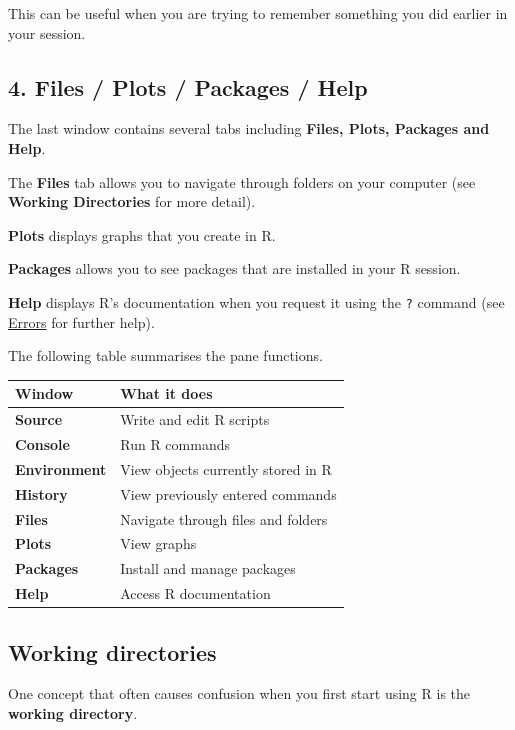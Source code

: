 \documentclass[
]{book}
\begin{document}
This can be useful when you are trying to remember something you did earlier in your session.

\subsection{4. Files / Plots / Packages / Help}\label{files-plots-packages-help}

The last window contains several tabs including \textbf{Files, Plots, Packages and Help}.

The \textbf{Files} tab allows you to navigate through folders on your computer (see \textbf{Working Directories} for more detail).

\textbf{Plots} displays graphs that you create in R.

\textbf{Packages} allows you to see packages that are installed in your R session.

\textbf{Help} displays R's documentation when you request it using the \texttt{?} command (see \hyperref[Errors]{Errors} for further help).

The following table summarises the pane functions.

\begin{longtable}[]{@{}ll@{}}
\toprule\noalign{}
Window & What it does \\
\midrule\noalign{}
\endhead
\bottomrule\noalign{}
\endlastfoot
\textbf{Source} & Write and edit R scripts \\
\textbf{Console} & Run R commands \\
\textbf{Environment} & View objects currently stored in R \\
\textbf{History} & View previously entered commands \\
\textbf{Files} & Navigate through files and folders \\
\textbf{Plots} & View graphs \\
\textbf{Packages} & Install and manage packages \\
\textbf{Help} & Access R documentation \\
\end{longtable}

\subsection{Working directories}\label{working-directories}

One concept that often causes confusion when you first start using R is the \textbf{working directory}.
\end{document}
